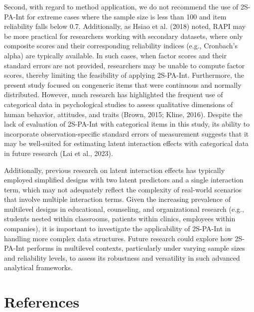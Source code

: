 \documentclass[
  man,mask]{apa6}
\begin{document}
Second, with regard to method application, we do not recommend the use of 2S-PA-Int for extreme cases where the sample size is less than 100 and item reliability falls below 0.7. Additionally, as Hsiao et al. (2018) noted, RAPI may be more practical for researchers working with secondary datasets, where only composite scores and their corresponding reliability indices (e.g., Cronbach's alpha) are typically available. In such cases, when factor scores and their standard errors are not provided, researchers may be unable to compute factor scores, thereby limiting the feasibility of applying 2S-PA-Int. Furthermore, the present study focused on congeneric items that were continuous and normally distributed. However, much research has highlighted the frequent use of categorical data in psychological studies to assess qualitative dimensions of human behavior, attitudes, and traits (Brown, 2015; Kline, 2016). Despite the lack of evaluation of 2S-PA-Int with categorical items in this study, its ability to incorporate observation-specific standard errors of measurement suggests that it may be well-suited for estimating latent interaction effects with categorical data in future research (Lai et al., 2023).

Additionally, previous research on latent interaction effects has typically employed simplified designs with two latent predictors and a single interaction term, which may not adequately reflect the complexity of real-world scenarios that involve multiple interaction terms. Given the increasing prevalence of multilevel designs in educational, counseling, and organizational research (e.g., students nested within classrooms, patients within clinics, employees within companies), it is important to investigate the applicability of 2S-PA-Int in handling more complex data structures. Future research could explore how 2S-PA-Int performs in multilevel contexts, particularly under varying sample sizes and reliability levels, to assess its robustness and versatility in such advanced analytical frameworks.

\newpage

\section{References}\label{references}
\end{document}

